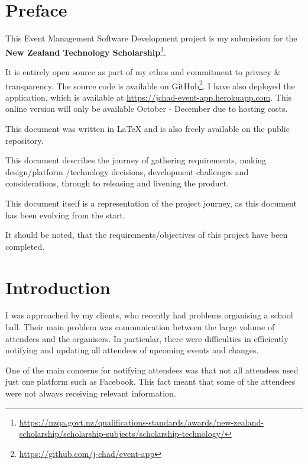 \documentclass[a4paper,oneside,12pt]{report}
\begin{document}
\begin{titlepage}
		\vfill

	\end{titlepage}

	\tableofcontents
	\pagebreak

	\chapter{Preface}
	This Event Management Software Development project is my submission for the \textbf{New Zealand Technology Scholarship}\footnote{\url{https://nzqa.govt.nz/qualifications-standards/awards/new-zealand-scholarship/scholarship-subjects/scholarship-technology/}}.

	It is entirely open source as part of my ethos and commitment to privacy \& transparency. The source code is available on GitHub\footnote{\url{https://github.com/j-chad/event-app}}.  I have also deployed the application, which is available at \url{https://jchad-event-app.herokuapp.com}. This online version will only be available October - December due to hosting costs.

	This document was written in \LaTeX{} and is also freely available on the public repository.
	
	This document describes the journey of gathering requirements, making design/platform /technology decisions, development challenges and considerations, through to releasing and livening the product.
	
	This document itself is a representation of the project journey, as this document has been evolving from the start.
	
	It should be noted, that the requirements/objectives of this project have been completed.

	\chapter{Introduction}
	I was approached by my clients, who recently had problems organising a school ball. Their main problem was communication between the large volume of attendees and the organisers. In particular, there were difficulties in efficiently notifying and updating all attendees of upcoming events and changes.

    One of the main concerns for notifying attendees was that not all attendees used just one platform such as Facebook. This fact meant that some of the attendees were not always receiving relevant information.
\end{document}
